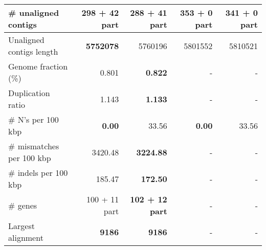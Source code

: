 \documentclass[12pt,a4paper]{article}
\begin{document}
\begin{table}[ht]
\begin{center}
\begin{tabular}{|l*{4}{|r}|}
\# unaligned contigs & 298 + 42 part & {\bf 288 + 41 part} & 353 + 0 part & 341 + 0 part \\ \hline
Unaligned contigs length & {\bf 5752078} & 5760196 & 5801552 & 5810521 \\ \hline
Genome fraction (\%) & 0.801 & {\bf 0.822} & - & - \\ \hline
Duplication ratio & 1.143 & {\bf 1.133} & - & - \\ \hline
\# N's per 100 kbp & {\bf 0.00} & 33.56 & {\bf 0.00} & 33.56 \\ \hline
\# mismatches per 100 kbp & 3420.48 & {\bf 3224.88} & - & - \\ \hline
\# indels per 100 kbp & 185.47 & {\bf 172.50} & - & - \\ \hline
\# genes & 100 + 11 part & {\bf 102 + 12 part} & - & - \\ \hline
Largest alignment & {\bf 9186} & {\bf 9186} & - & - \\ \hline
\end{tabular}
\end{center}
\end{table}
\end{document}
